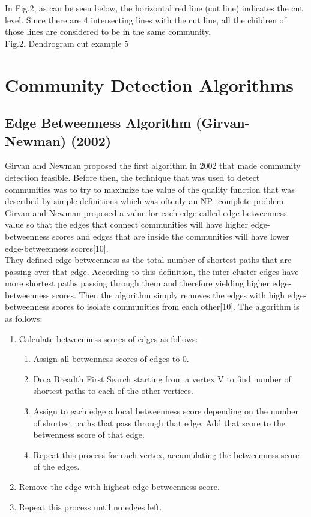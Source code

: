 \documentclass[10pt]{article}
\begin{document}
In Fig.2, as can be seen below, the horizontal red line (cut line) indicates the cut level. Since there are 4 intersecting lines with the cut line, all the children of those lines are considered to be in the same community. \\

Fig.2. Dendrogram cut example 5 \\
    
\section{Community Detection Algorithms} 

\subsection{Edge Betweenness Algorithm (Girvan-Newman) (2002)} 

Girvan and Newman proposed the first algorithm in 2002 that made community detection feasible. Before then, the technique that was used to detect communities was to try to maximize the value of the quality function that was described by simple definitions which was oftenly an NP- complete problem. \\

Girvan and Newman proposed a value for each edge called edge-betweenness value so that the edges that connect communities will have higher edge-betweenness scores and edges that are inside the communities will have lower edge-betweenness scores[10]. \\

They defined edge-betweenness as the total number of shortest paths that are passing over that edge. According to this definition, the inter-cluster edges have more shortest paths passing through them and therefore yielding higher edge-betweenness scores. Then the algorithm simply removes the edges with high edge-betweenness scores to isolate communities from each other[10]. The algorithm is as follows: \\

\begin{enumerate}
\item Calculate betweenness scores of edges as follows:
\begin{enumerate}
\item Assign all betwenness scores of edges to 0.
\item Do a Breadth First Search starting from a vertex V to find number of shortest paths to each of the other vertices.
\item Assign to each edge a local betweenness score depending on the number of shortest paths that pass through that edge. Add that score to the betwenness score of that edge.
\item Repeat this process for each vertex, accumulating the betweenness score of the edges.
\end{enumerate}
\item Remove the edge with highest edge-betweenness score.
\item Repeat this process until no edges left.
\end{enumerate}
\end{document}
